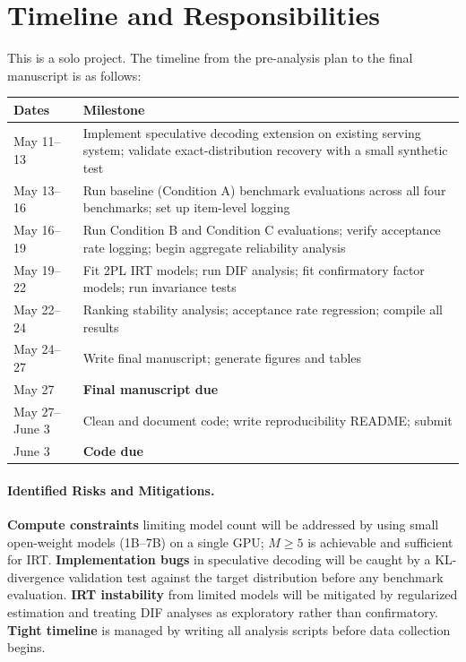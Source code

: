 \documentclass{article}
\begin{document}
\section{Timeline and Responsibilities}

This is a solo project. The timeline from the pre-analysis plan to the final manuscript is as follows:

\begin{center}
\begin{tabular}{p{2cm} p{9cm}}
\toprule
\textbf{Dates} & \textbf{Milestone} \\
\midrule
May 11--13 & Implement speculative decoding extension on existing serving system; validate exact-distribution recovery with a small synthetic test \\
May 13--16 & Run baseline (Condition A) benchmark evaluations across all four benchmarks; set up item-level logging \\
May 16--19 & Run Condition B and Condition C evaluations; verify acceptance rate logging; begin aggregate reliability analysis \\
May 19--22 & Fit 2PL IRT models; run DIF analysis; fit confirmatory factor models; run invariance tests \\
May 22--24 & Ranking stability analysis; acceptance rate regression; compile all results \\
May 24--27 & Write final manuscript; generate figures and tables \\
May 27 & \textbf{Final manuscript due} \\
May 27--June 3 & Clean and document code; write reproducibility README; submit \\
June 3 & \textbf{Code due} \\
\bottomrule
\end{tabular}
\end{center}

\paragraph{Identified Risks and Mitigations.}
\textbf{Compute constraints} limiting model count will be addressed by using small open-weight models (1B--7B) on a single GPU; $M \geq 5$ is achievable and sufficient for IRT.
\textbf{Implementation bugs} in speculative decoding will be caught by a KL-divergence validation test against the target distribution before any benchmark evaluation.
\textbf{IRT instability} from limited models will be mitigated by regularized estimation and treating DIF analyses as exploratory rather than confirmatory.
\textbf{Tight timeline} is managed by writing all analysis scripts before data collection begins.
\end{document}
